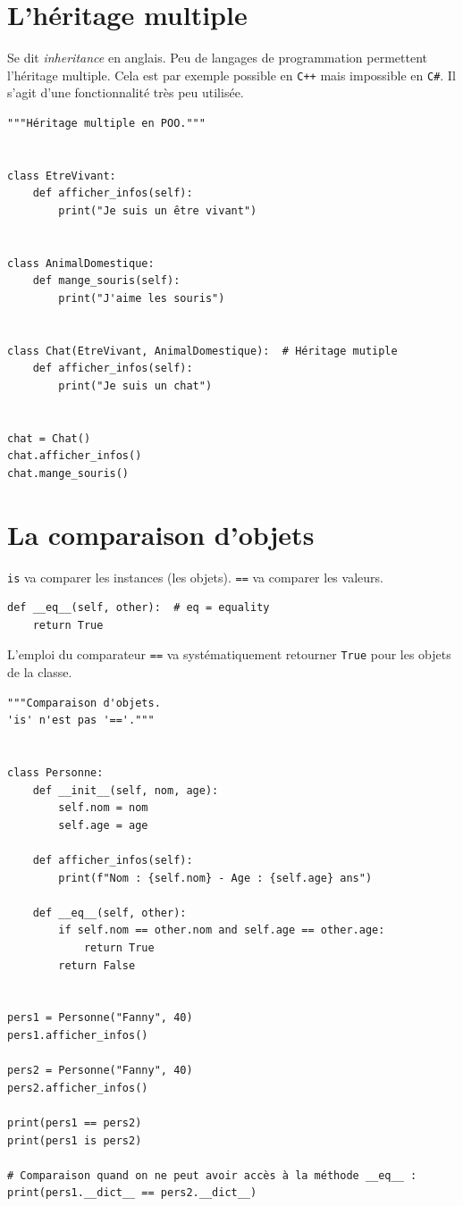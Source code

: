 \documentclass[a4paper,11pt]{book}
\begin{document}
\section{L'héritage multiple}
Se dit \textit{inheritance} en anglais. Peu de langages de programmation permettent l'héritage multiple. Cela est par exemple possible en \texttt{C++} mais impossible en \texttt{C\#}. Il s'agit d'une fonctionnalité très peu utilisée.
\medskip

\begin{lstlisting}
"""Héritage multiple en POO."""


class EtreVivant:
    def afficher_infos(self):
        print("Je suis un être vivant")


class AnimalDomestique:
    def mange_souris(self):
        print("J'aime les souris")


class Chat(EtreVivant, AnimalDomestique):  # Héritage mutiple
    def afficher_infos(self):
        print("Je suis un chat")


chat = Chat()
chat.afficher_infos()
chat.mange_souris()
\end{lstlisting}
\medskip

\section{La comparaison d'objets}
\texttt{is} va comparer les instances (les objets). \texttt{==} va comparer les valeurs.
\begin{lstlisting}
def __eq__(self, other):  # eq = equality
    return True
\end{lstlisting}
\medskip

L'emploi du comparateur \texttt{==} va systématiquement retourner \texttt{True} pour les objets de la classe.
\begin{lstlisting}
"""Comparaison d'objets.
'is' n'est pas '=='."""


class Personne:
    def __init__(self, nom, age):
        self.nom = nom
        self.age = age

    def afficher_infos(self):
        print(f"Nom : {self.nom} - Age : {self.age} ans")

    def __eq__(self, other):
        if self.nom == other.nom and self.age == other.age:
            return True
        return False


pers1 = Personne("Fanny", 40)
pers1.afficher_infos()

pers2 = Personne("Fanny", 40)
pers2.afficher_infos()

print(pers1 == pers2)
print(pers1 is pers2)

# Comparaison quand on ne peut avoir accès à la méthode __eq__ :
print(pers1.__dict__ == pers2.__dict__)
\end{lstlisting}
\medskip
\end{document}
